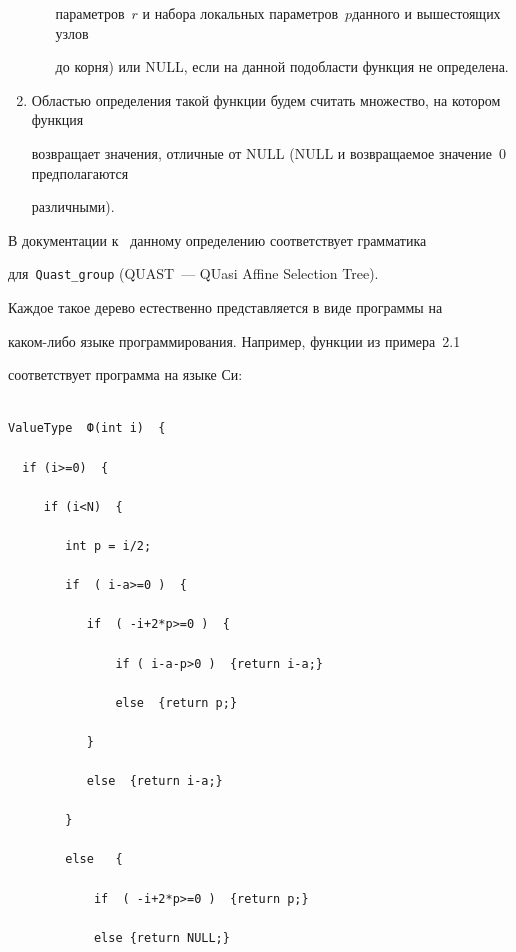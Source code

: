 \begin{multicols}{2}
\begin{enumerate}
\begin{itemize}
    па\-ра\-мет\-ров~$r$ и набора локальных па\-ра\-мет\-ров~$p$\linebreak данного и вышестоящих узлов 

    до корня) или NULL, если на данной подобласти функция не определена.\\[-15pt]

    \end{itemize}



\item Областью определения такой функции будем считать множество, на котором функция 

возвращает значения, отличные от NULL (NULL и возвращаемое значение~0 предполагаются 

различными).

\end{enumerate}



\smallskip



В документации к~\cite{Feautrier3} данному определению соответствует грамматика 

для~\verb+Quast_group+ (QUAST~--- QUasi Affine Selection Tree).



Каждое такое дерево естественно представляется в виде программы на 

каком-либо языке программирования. Например, функции из примера~2.1

соответствует программа на языке Си:

\begin{verbatim}

ValueType  Ф(int i)  {

  if (i>=0)  {

     if (i<N)  {

        int p = i/2;

        if  ( i-a>=0 )  {

           if  ( -i+2*p>=0 )  {

               if ( i-a-p>0 )  {return i-a;}

               else  {return p;}

           }

           else  {return i-a;}

        }

        else   {

            if  ( -i+2*p>=0 )  {return p;}

            else {return NULL;}


\end{verbatim}
\end{multicols}
